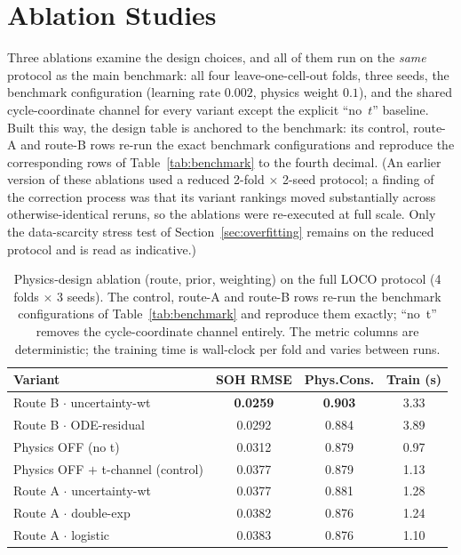 \section{Ablation Studies}
\label{sec:ablations}

Three ablations examine the design choices, and all of them run on the
\emph{same} protocol as the main benchmark: all four leave-one-cell-out folds,
three seeds, the benchmark configuration (learning rate $0.002$, physics
weight $0.1$), and the shared cycle-coordinate channel for every variant
except the explicit ``no~$t$'' baseline. Built this way, the design table is
anchored to the benchmark: its control, route-A and route-B rows re-run the
exact benchmark configurations and reproduce the corresponding rows of
Table~\ref{tab:benchmark} to the fourth decimal. (An earlier version of these
ablations used a reduced 2-fold $\times$ 2-seed protocol; a finding of the
correction process was that its variant rankings moved substantially across
otherwise-identical reruns, so the ablations were re-executed at full scale.
Only the data-scarcity stress test of Section~\ref{sec:overfitting} remains on
the reduced protocol and is read as indicative.)

\begin{table}[H]
\centering
\caption{Physics-design ablation (route, prior, weighting) on the full LOCO
protocol (4 folds $\times$ 3 seeds). The control, route-A and route-B rows
re-run the benchmark configurations of Table~\ref{tab:benchmark} and reproduce
them exactly; ``no~t'' removes the cycle-coordinate channel entirely. The
metric columns are deterministic; the training time is wall-clock per fold and
varies between runs.}
\label{tab:ablation}
\begin{tabular}{l c c c}
\toprule
\textbf{Variant} & \textbf{SOH RMSE} & \textbf{Phys.Cons.} & \textbf{Train (s)} \\
\midrule
Route B $\cdot$ uncertainty-wt         & \textbf{0.0259} & \textbf{0.903} & 3.33 \\
Route B $\cdot$ ODE-residual           & 0.0292 & 0.884 & 3.89 \\
Physics OFF (no t)                     & 0.0312 & 0.879 & 0.97 \\
Physics OFF $+$ t-channel (control)    & 0.0377 & 0.879 & 1.13 \\
Route A $\cdot$ uncertainty-wt         & 0.0377 & 0.881 & 1.28 \\
Route A $\cdot$ double-exp             & 0.0382 & 0.876 & 1.24 \\
Route A $\cdot$ logistic               & 0.0383 & 0.876 & 1.10 \\
\bottomrule
\end{tabular}
\end{table}

